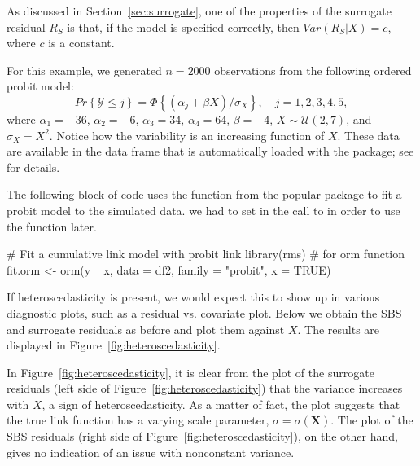 As discussed in Section~\ref{sec:surrogate}, one of the properties of the surrogate residual $R_S$ is that, if the model is specified correctly, then $Var\left(R_S | X\right) = c$, where $c$ is a constant.

For this example, we generated $n = 2000$ observations from the following ordered probit model:
\begin{equation*}
  Pr\left\{\mathcal{Y} \le j\right\} = \Phi\left\{\left(\alpha_j + \beta X\right) / \sigma_X\right\}, \quad j = 1, 2, 3, 4, 5,
\end{equation*}
where $\alpha_1 = -36$, $\alpha_2 = -6$, $\alpha_3 = 34$, $\alpha_4 = 64$, $\beta = -4$, $X \sim \mathcal{U}\left(2, 7\right)$, and $\sigma_X = X ^ 2$.
Notice how the variability is an increasing function of $X$. These data are available in the  data frame that is automatically loaded with the  package; see  for details.

The following block of code uses the  function from the popular  package to fit a probit model to the simulated data.  we had to set  in the call to  in order to use the  function later.
\begin{example}
# Fit a cumulative link model with probit link
library(rms)  # for orm function
fit.orm <- orm(y ~ x, data = df2, family = "probit", x = TRUE)
\end{example}

If heteroscedasticity is present, we would expect this to show up in various diagnostic plots, such as a residual vs. covariate plot. Below we obtain the SBS and surrogate residuals as before and plot them against $X$. The results are displayed in Figure~\ref{fig:heteroscedasticity}.

In Figure~\ref{fig:heteroscedasticity}, it is clear from the plot of the surrogate residuals (left side of Figure~\ref{fig:heteroscedasticity}) that the variance increases with $X$, a sign of heteroscedasticity. As a matter of fact, the plot suggests that the true link function has a varying scale parameter, $\sigma = \sigma\left(\boldsymbol{X}\right)$. The plot of the SBS residuals (right side of Figure~\ref{fig:heteroscedasticity}), on the other hand, gives no indication of an issue with nonconstant variance.

